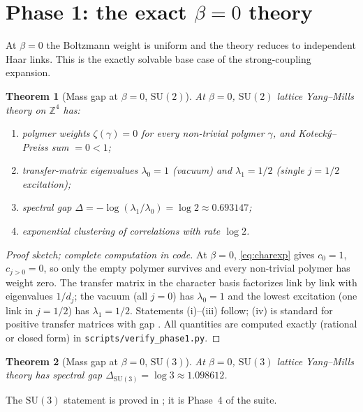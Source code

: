 \documentclass[11pt,a4paper]{article}
\newtheorem{theorem}{Theorem}[section]
\newcommand{\SU}{\mathrm{SU}}
\newcommand{\Z}{\mathbb{Z}}
\newcommand{\gap}{\Delta}
\begin{document}
\section{Phase 1: the exact $\beta = 0$ theory}
\label{sec:phase1}

At $\beta = 0$ the Boltzmann weight is uniform and the theory reduces to
independent Haar links.  This is the exactly solvable base case of the
strong-coupling expansion.

\begin{theorem}[Mass gap at $\beta = 0$, $\SU(2)$]
\label{thm:phase1}
At $\beta = 0$, $\SU(2)$ lattice Yang--Mills theory on $\Z^4$ has:
\begin{enumerate}[label=(\roman*)]
  \item polymer weights $\zeta(\gamma) = 0$ for every non-trivial polymer
    $\gamma$, and Koteck\'y--Preiss sum $= 0 < 1$;
  \item transfer-matrix eigenvalues $\lambda_0 = 1$ (vacuum) and
    $\lambda_1 = 1/2$ (single $j = 1/2$ excitation);
  \item spectral gap $\gap = -\log(\lambda_1/\lambda_0) = \log 2
    \approx 0.693147$;
  \item exponential clustering of correlations with rate $\log 2$.
\end{enumerate}
\end{theorem}

\begin{proof}[Proof sketch; complete computation in code]
At $\beta = 0$, \cref{eq:charexp} gives $c_0 = 1$, $c_{j>0} = 0$, so only
the empty polymer survives and every non-trivial polymer has weight zero.
The transfer matrix in the character basis factorizes link by link with
eigenvalues $1/d_j$; the vacuum (all $j = 0$) has $\lambda_0 = 1$ and the
lowest excitation (one link in $j = 1/2$) has $\lambda_1 = 1/2$.  Statements
(i)--(iii) follow; (iv) is standard for positive transfer matrices with gap
\cite{seiler1982}.  All quantities are computed exactly (rational or closed
form) in \texttt{scripts/verify\_phase1.py}.
\end{proof}

\begin{theorem}[Mass gap at $\beta = 0$, $\SU(3)$]
\label{thm:phase1su3}
At $\beta = 0$, $\SU(3)$ lattice Yang--Mills theory has spectral gap
$\gap_{\SU(3)} = \log 3 \approx 1.098612$.
\end{theorem}

The $\SU(3)$ statement is proved in ; it is Phase~4 of the
suite.
\end{document}
